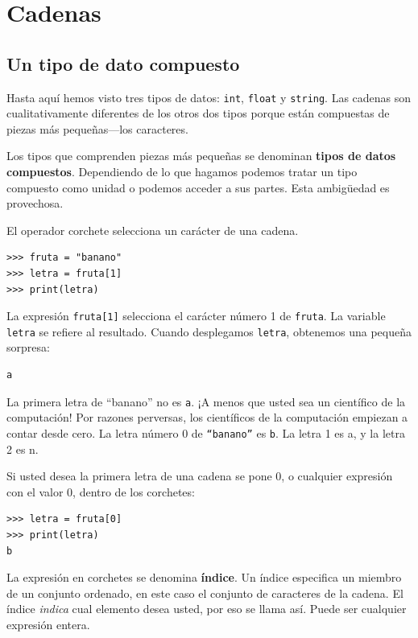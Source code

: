 
\chapter{Cadenas }

\label{strings}

\section{Un tipo de dato compuesto}

 

Hasta aquí hemos visto tres tipos de datos: \texttt{int}, \texttt{float}
y \texttt{string}. Las cadenas son cualitativamente diferentes de
los otros dos tipos porque están compuestas de piezas más pequeñas—los
caracteres.


Los tipos que comprenden piezas más pequeñas se denominan \textbf{tipos
de datos compuestos}. Dependiendo de lo que hagamos podemos tratar
un tipo compuesto como unidad o podemos acceder a sus partes. Esta
ambigüedad es provechosa.

 

El operador corchete selecciona un carácter de una cadena.

\begin{verbatim}
>>> fruta = "banano"
>>> letra = fruta[1]
>>> print(letra)	
\end{verbatim}

La expresión \texttt{fruta{[}1{]}} selecciona el carácter número 1
de \texttt{fruta}. La variable \texttt{letra} se refiere al resultado.
Cuando desplegamos \texttt{letra}, obtenemos una pequeña sorpresa:
\begin{verbatim}
a
\end{verbatim}
La primera letra de ``banano'' no es \texttt{a}. ¡A menos que usted
sea un científico de la computación! Por razones perversas, los científicos
de la computación empiezan a contar desde cero. La letra número 0
de \texttt{``banano''} es \texttt{b}. La letra 1 es a, y la letra
2 es n.

Si usted desea la primera letra de una cadena se pone 0, o cualquier
expresión con el valor 0, dentro de los corchetes:
\begin{verbatim}
>>> letra = fruta[0]
>>> print(letra)
b
\end{verbatim}

La expresión en corchetes se denomina \textbf{índice}. Un índice especifica
un miembro de un conjunto ordenado, en este caso el conjunto de caracteres
de la cadena. El índice {\em indica} cual elemento desea usted,
por eso se llama así. Puede ser cualquier expresión entera.

